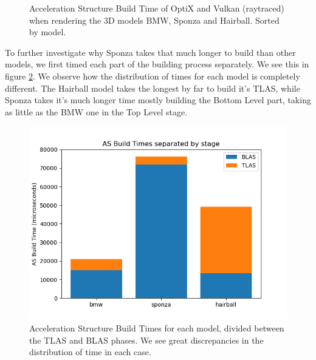 \begin{figure}
    \caption{Acceleration Structure Build Time of OptiX and Vulkan (raytraced) when rendering the 3D models BMW, Sponza and Hairball. Sorted by model.}
    \label{as-build-time-geometry-comparison-graph}
\end{figure}

To further investigate why Sponza takes that much longer to build than other models, we first timed each part of the building process separately. We see this in figure \ref{as-build-time-decomposed}. We observe how the distribution of times for each model is completely different. The Hairball model takes the longest by far to build it's TLAS, while Sponza takes it's much longer time mostly building the Bottom Level part, taking as little as the BMW one in the Top Level stage.

\begin{figure}[hbt!]
    \centering
    \includegraphics[width=1.0\textwidth]{figuras/optix-accelbuildtimes-decomposed.png}
    \caption{Acceleration Structure Build Times for each model, divided between the TLAS and BLAS phases. We see great discrepancies in the distribution of time in each case.}
    \label{as-build-time-decomposed}
\end{figure}
\clearpage

